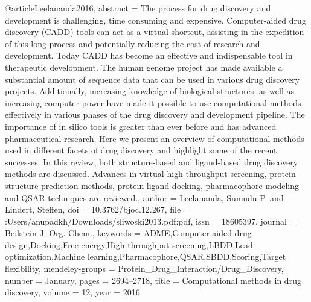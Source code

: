 @article{Leelananda2016,
abstract = {The process for drug discovery and development is challenging, time consuming and expensive. Computer-aided drug discovery (CADD) tools can act as a virtual shortcut, assisting in the expedition of this long process and potentially reducing the cost of research and development. Today CADD has become an effective and indispensable tool in therapeutic development. The human genome project has made available a substantial amount of sequence data that can be used in various drug discovery projects. Additionally, increasing knowledge of biological structures, as well as increasing computer power have made it possible to use computational methods effectively in various phases of the drug discovery and development pipeline. The importance of in silico tools is greater than ever before and has advanced pharmaceutical research. Here we present an overview of computational methods used in different facets of drug discovery and highlight some of the recent successes. In this review, both structure-based and ligand-based drug discovery methods are discussed. Advances in virtual high-throughput screening, protein structure prediction methods, protein-ligand docking, pharmacophore modeling and QSAR techniques are reviewed.},
author = {Leelananda, Sumudu P. and Lindert, Steffen},
doi = {10.3762/bjoc.12.267},
file = {:Users/anupadkh/Downloads/sliwoski2013.pdf:pdf},
issn = {18605397},
journal = {Beilstein J. Org. Chem.},
keywords = {ADME,Computer-aided drug design,Docking,Free energy,High-throughput screening,LBDD,Lead optimization,Machine learning,Pharmacophore,QSAR,SBDD,Scoring,Target flexibility},
mendeley-groups = {Protein{\_}Drug{\_}Interaction/Drug{\_}Discovery},
number = {January},
pages = {2694--2718},
title = {{Computational methods in drug discovery}},
volume = {12},
year = {2016}
}
